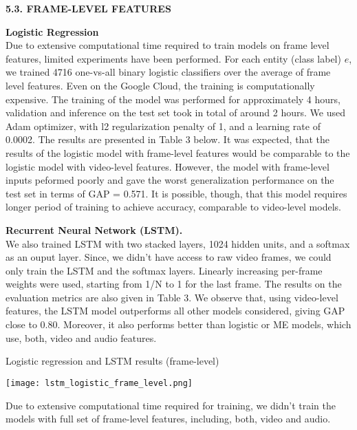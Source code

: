 \documentclass{sig-alternate-05-2015}
\begin{document}
\noindent 
\textbf{5.3. FRAME-LEVEL FEATURES}

\vspace{1em}
\noindent 
\textbf{Logistic Regression} \\
Due to extensive computational time required to train models on frame level features, limited experiments have been performed.  For each entity (class label) $e$, we trained 4716 one-vs-all binary logistic classifiers over the average of frame level features. Even on the Google Cloud, the training is computationally expensive. The training of the model was performed for approximately 4 hours, validation and inference on the test set took in total of around 2 hours. We used Adam optimizer, with l2 regularization penalty of 1, and a learning rate of 0.0002. The results are presented in Table 3 below. It was expected, that the results of the logistic model with frame-level features would be comparable to the logistic model with video-level features. However, the model with frame-level inputs peformed poorly and gave the worst generalization performance on the test set in terms of GAP = 0.571. It is possible, though, that this model requires longer period of training to achieve accuracy, comparable to video-level models. 


\vspace{1em}
\noindent 
\textbf{Recurrent Neural Network (LSTM).} \\
We also trained LSTM with two stacked layers,  1024 hidden units, and a softmax as an ouput layer. Since, we didn't have access to raw video frames, we could only train the LSTM and the softmax layers. Linearly increasing per-frame weights were used, starting from 1/N to 1 for the last frame. The results on the evaluation metrics are also given in Table 3. We observe that, using video-level features, the LSTM model outperforms all other models considered, giving GAP close to 0.80. Moreover, it also performs better than logistic or ME models, which use, both, video and audio features. 

	\begin{table}[h!]
	\noindent
	\small\caption{Logistic regression and LSTM results (frame-level)}\small
  	\texttt{[image: lstm\_logistic\_frame\_level.png]}
	\end{table}


Due to extensive computational time required for training, we didn't train the models with full set of frame-level features, including, both, video and audio.


\vspace{3em}
\end{document}
